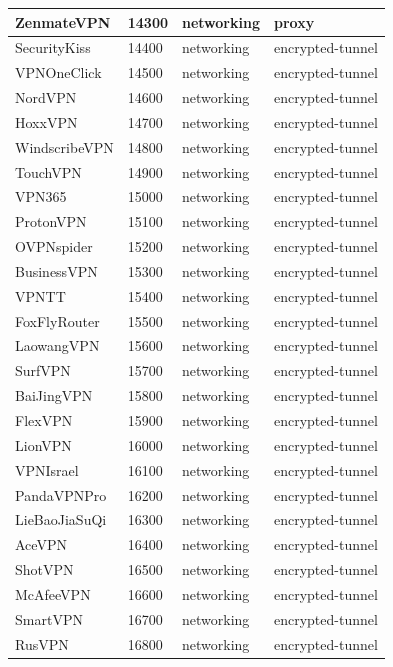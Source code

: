\begin{longtable}{p{}|p{}|p{}|p{}}
    ZenmateVPN &	14300 &	networking &	proxy \\ \hline
    SecurityKiss &	14400 &	networking &	encrypted-tunnel \\ \hline
    VPNOneClick &	14500 &	networking &	encrypted-tunnel \\ \hline
    NordVPN &	14600 &	networking &	encrypted-tunnel \\ \hline
    HoxxVPN &	14700 &	networking &	encrypted-tunnel \\ \hline
    WindscribeVPN &	14800 &	networking &	encrypted-tunnel \\ \hline
    TouchVPN &	14900 &	networking &	encrypted-tunnel \\ \hline
    VPN365 &	15000 &	networking &	encrypted-tunnel \\ \hline
    ProtonVPN &	15100 &	networking &	encrypted-tunnel \\ \hline
    OVPNspider &	15200 &	networking &	encrypted-tunnel \\ \hline
    BusinessVPN &	15300 &	networking &	encrypted-tunnel \\ \hline
    VPNTT &	15400 &	networking &	encrypted-tunnel \\ \hline
    FoxFlyRouter &	15500 &	networking &	encrypted-tunnel \\ \hline
    LaowangVPN &	15600 &	networking &	encrypted-tunnel \\ \hline
    SurfVPN &	15700 &	networking &	encrypted-tunnel \\ \hline
    BaiJingVPN &	15800 &	networking &	encrypted-tunnel \\ \hline
    FlexVPN &	15900 &	networking &	encrypted-tunnel \\ \hline
    LionVPN &	16000 &	networking &	encrypted-tunnel \\ \hline
    VPNIsrael &	16100 &	networking &	encrypted-tunnel \\ \hline
    PandaVPNPro &	16200 &	networking &	encrypted-tunnel \\ \hline
    LieBaoJiaSuQi &	16300 &	networking &	encrypted-tunnel \\ \hline
    AceVPN &	16400 &	networking &	encrypted-tunnel \\ \hline
    ShotVPN &	16500 &	networking &	encrypted-tunnel \\ \hline
    McAfeeVPN &	16600 &	networking &	encrypted-tunnel \\ \hline
    SmartVPN &	16700 &	networking &	encrypted-tunnel \\ \hline
    RusVPN &	16800 &	networking &	encrypted-tunnel \\ \hline

\end{longtable}
